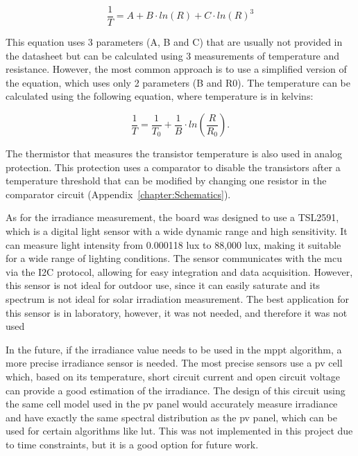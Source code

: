     \begin{equation}
        \frac{1}{T} = A + B \cdot ln(R) + C \cdot ln(R)^3
    \end{equation}

    This equation uses 3 parameters (A, B and C) that are usually not provided in the datasheet but can be calculated using 3 measurements of temperature and resistance. However, the most common approach is to use a simplified version of the equation, which uses only 2 parameters (B and R0). The temperature can be calculated using the following equation, where temperature is in kelvins:

    \begin{equation}
        \frac{1}{T} = \frac{1}{T_0} + \frac{1}{B} \cdot ln(\frac{R}{R_0}) .
    \end{equation}

    The thermistor that measures the transistor temperature is also used in analog protection. This protection uses a comparator to disable the transistors after a temperature threshold that can be modified by changing one resistor in the comparator circuit (Appendix~\ref{chapter:Schematics}). 

    As for the irradiance measurement, the board was designed to use a TSL2591, which is a digital light sensor with a wide dynamic range and high sensitivity. It can measure light intensity from 0.000118 lux to 88,000 lux, making it suitable for a wide range of lighting conditions. The sensor communicates with the \ac{mcu} via the I2C protocol, allowing for easy integration and data acquisition. However, this sensor is not ideal for outdoor use, since it can easily saturate and its spectrum is not ideal for solar irradiation measurement. The best application for this sensor is in laboratory, however, it was not needed, and therefore it was not used

    In the future, if the irradiance value needs to be used in the \ac{mppt} algorithm, a more precise irradiance sensor is needed. The most precise sensors use a \ac{pv} cell which, based on its temperature, short circuit current and open circuit voltage can provide a good estimation of the irradiance. The design of this circuit using the same cell model used in the \ac{pv} panel would accurately measure irradiance and have exactly the same spectral distribution as the \ac{pv} panel, which can be used for certain algorithms like \ac{lut}. This was not implemented in this project due to time constraints, but it is a good option for future work.


